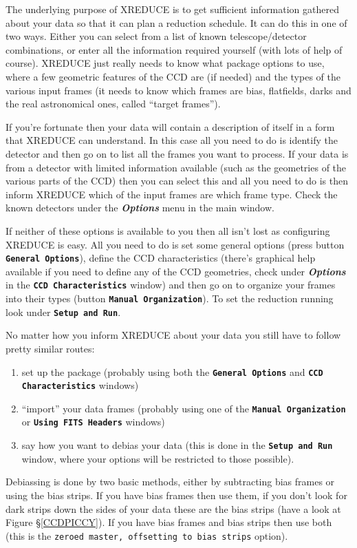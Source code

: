 \documentclass[twoside,11pt]{article}
\newcommand{\hyperref}[4]{#2\ref{#4}#3}
\newcommand{\htmlref}[2]{#1}
\renewcommand{\_}{\texttt{\symbol{95}}}
\newcommand{\butt}[1]{{\small \bf \tt #1}}
\newcommand{\menu}[1]{{\small \bf \em #1}}
\newcommand{\text}[1]{{\small \tt #1}}
\newcommand{\routine}[1]{{\sc #1}}
\newcommand{\xroutine}[1]{\htmlref{{\sc #1}}{#1}}
\begin{document}
The underlying purpose of \xroutine{XREDUCE} is to get sufficient
information gathered about your data so that it can plan a reduction
schedule. It can do this in one of two ways. Either you can select
from a list of known telescope/detector combinations, or enter
all the information required yourself (with lots of help of course).
\routine{XREDUCE} just really needs to know what package options to
use, where a few geometric features of the CCD are (if needed) and the
types of the various input frames (it needs to know which frames are
bias, flatfields, darks and the real astronomical ones, called
``target frames'').

If you're fortunate then your data will contain a description of
itself in a form that \routine{XREDUCE} can understand. In this case
all you need to do is identify the detector and then go on to list all
the frames you want to process. If your data is from a detector with
limited information available (such as the geometries of the various
parts of the CCD) then you can select this and all you need to do is
then inform \routine{XREDUCE} which of the input frames are which frame
type. Check the known detectors under the \menu{Options} menu in the
main window.

If neither of these options is available to you then all isn't lost as
configuring \routine{XREDUCE} is easy. All you need to do is set some
general options (press button \butt{General Options}), define the CCD
characteristics (there's graphical help available if you need to
define any of the CCD geometries, check under \menu{Options} in the
\butt{CCD Characteristics} window) and then go on to organize your
frames into their types (button \butt{Manual Organization}). To set
the reduction running look under \butt{Setup and Run}.

No matter how you inform \routine{XREDUCE} about your data you still
have to follow pretty similar routes:
\begin{enumerate}
\item set up the package (probably using both the \butt{General Options}
and \butt{CCD Characteristics} windows)
\item ``import'' your data frames (probably using one of the
\butt{Manual Organization} or \butt{Using FITS Headers} windows)
\item say how you want to debias your data (this is done in the
\butt{Setup and Run} window, where your options will be restricted
to those possible).
\end{enumerate}
Debiassing is done by two basic methods, either by subtracting bias frames
or using the bias strips. If you have bias frames then use them, if
you don't look for dark strips down the sides of your data these are
the bias strips (have a look at \hyperref{this figure}{Figure
\S}{}{CCDPICCY}).
If you have bias frames and bias strips then use both (this is the
\text{zeroed master, offsetting to bias strips} option).
\end{document}
